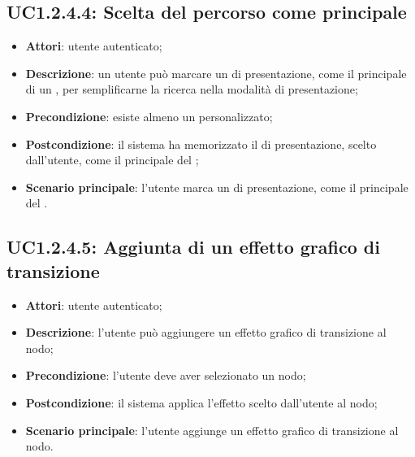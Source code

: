 \subsection{UC1.2.4.4: Scelta del percorso come principale}
\label{UC1.2.4.4}
\begin{itemize}
\item \textbf{Attori}: utente autenticato;
\item \textbf{Descrizione}: un utente può marcare un  di presentazione, come il  principale di un , per semplificarne la ricerca nella modalità di presentazione;
\item \textbf{Precondizione}: esiste almeno un  personalizzato;
\item \textbf{Postcondizione}: il sistema ha memorizzato il  di presentazione, scelto dall'utente, come il  principale del ;
\item \textbf{Scenario principale}:
l'utente marca un  di presentazione, come il  principale del .
\end{itemize}
\subsection{UC1.2.4.5: Aggiunta di un effetto grafico di transizione}
\label{UC1.2.4.5}
\begin{itemize}
\item \textbf{Attori}: utente autenticato;
\item \textbf{Descrizione}: l'utente può aggiungere un effetto grafico di transizione al nodo;
\item \textbf{Precondizione}: l'utente deve aver selezionato un nodo;
\item \textbf{Postcondizione}: il sistema applica l'effetto scelto dall'utente al nodo;
\item \textbf{Scenario principale}:
l'utente aggiunge un effetto grafico di transizione al nodo.
\end{itemize}
